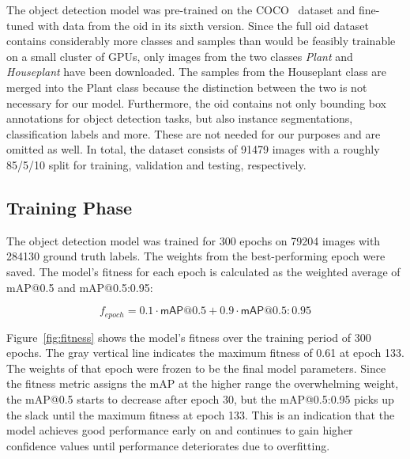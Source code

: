 \documentclass[draft,final]{vutinfth} %
\begin{document}
The object detection model was pre-trained on the COCO~\cite{lin2015}
dataset and fine-tuned with data from the \gls{oid}
\cite{kuznetsova2020} in its sixth version. Since the full \gls{oid}
dataset contains considerably more classes and samples than would be
feasibly trainable on a small cluster of GPUs, only images from the
two classes \emph{Plant} and \emph{Houseplant} have been
downloaded. The samples from the Houseplant class are merged into the
Plant class because the distinction between the two is not necessary
for our model. Furthermore, the \gls{oid} contains not only bounding
box annotations for object detection tasks, but also instance
segmentations, classification labels and more. These are not needed
for our purposes and are omitted as well. In total, the dataset
consists of 91479 images with a roughly 85/5/10 split for training,
validation and testing, respectively.

\subsection{Training Phase}
\label{ssec:yolo-training}

The object detection model was trained for 300 epochs on 79204 images
with 284130 ground truth labels. The weights from the best-performing
epoch were saved. The model's fitness for each epoch is calculated as
the weighted average of \textsf{mAP}@0.5 and \textsf{mAP}@0.5:0.95:

\begin{equation}
  \label{eq:fitness}
  f_{epoch} = 0.1 \cdot \mathsf{mAP}@0.5 + 0.9 \cdot \mathsf{mAP}@0.5\mathrm{:}0.95
\end{equation}

Figure~\ref{fig:fitness} shows the model's fitness over the training
period of 300 epochs. The gray vertical line indicates the maximum
fitness of 0.61 at epoch 133. The weights of that epoch were frozen to
be the final model parameters. Since the fitness metric assigns the
\textsf{mAP} at the higher range the overwhelming weight, the
\textsf{mAP}@0.5 starts to decrease after epoch 30, but the
\textsf{mAP}@0.5:0.95 picks up the slack until the maximum fitness at
epoch 133. This is an indication that the model achieves good
performance early on and continues to gain higher confidence values
until performance deteriorates due to overfitting.
\end{document}

